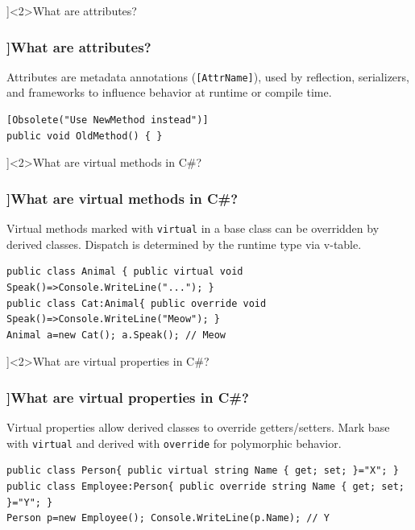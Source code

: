 \QuestionSlide[\CategoryBadge[LangColor!20]{Language Feature}]<2>{What are attributes?}
\begin{frame}[fragile]
  \frametitle{\AnswerTitle[\CategoryBadge[LangColor!20]{Language Feature}]{What are attributes?}}

  {\footnotesize
    Attributes are metadata annotations (\texttt{[AttrName]}), used by reflection, serializers, and frameworks to influence behavior at runtime or compile time.
  }

  \begin{verbatim}
[Obsolete("Use NewMethod instead")]
public void OldMethod() { }
  \end{verbatim}
\end{frame}

\QuestionSlide[\CategoryBadge[LangColor!20]{Language Feature}]<2>{What are virtual methods in C\#?}
\begin{frame}[fragile]
  \frametitle{\AnswerTitle[\CategoryBadge[LangColor!20]{Language Feature}]{What are virtual methods in C\#?}}

  {\footnotesize
    Virtual methods marked with \texttt{virtual} in a base class can be overridden by derived classes. Dispatch is determined by the runtime type via v-table.
  }

  \begin{verbatim}
public class Animal { public virtual void Speak()=>Console.WriteLine("..."); }
public class Cat:Animal{ public override void Speak()=>Console.WriteLine("Meow"); }
Animal a=new Cat(); a.Speak(); // Meow
  \end{verbatim}
\end{frame}

\QuestionSlide[\CategoryBadge[LangColor!20]{Language Feature}]<2>{What are virtual properties in C\#?}
\begin{frame}[fragile]
  \frametitle{\AnswerTitle[\CategoryBadge[LangColor!20]{Language Feature}]{What are virtual properties in C\#?}}

  {\footnotesize
    Virtual properties allow derived classes to override getters/setters. Mark base with \texttt{virtual} and derived with \texttt{override} for polymorphic behavior.
  }

  \begin{verbatim}
public class Person{ public virtual string Name { get; set; }="X"; }
public class Employee:Person{ public override string Name { get; set; }="Y"; }
Person p=new Employee(); Console.WriteLine(p.Name); // Y
  \end{verbatim}
\end{frame}

